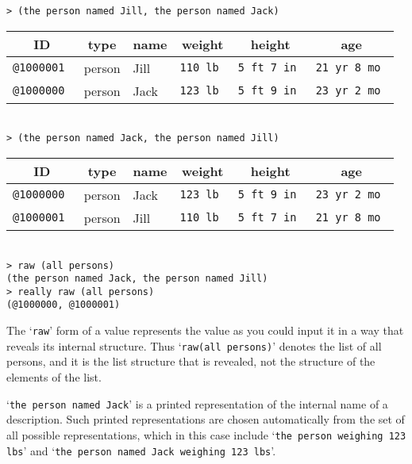 \documentclass[12pt]{article}
\newenvironment{indpar}[1][0.3in]%
	{\begin{list}{}%
		     {\setlength{\itemsep}{0in}%
		      \setlength{\topsep}{0in}%
		      \setlength{\parsep}{1ex}%
		      \setlength{\labelwidth}{#1}%
		      \setlength{\leftmargin}{#1}%
		      \addtolength{\leftmargin}{\labelsep}}%
	 \item}%
	{\end{list}}
\begin{document}
\begin{indpar}
\verb|> (the person named Jill, the person named Jack)| \\
\begin{tabular}{|r|l|l|r|r|r|}
\hline
\multicolumn{1}{|c}{\bf ID} &
\multicolumn{1}{|c}{\bf type} &
\multicolumn{1}{|c}{\bf name} &
\multicolumn{1}{|c}{\bf weight} &
\multicolumn{1}{|c}{\bf height} &
\multicolumn{1}{|c|}{\bf age} \\
\hline
\tt @1000001 & person & Jill & \tt 110 lb & \tt 5 ft 7 in & \tt 21 yr 8 mo \\
\tt @1000000 & person & Jack & \tt 123 lb & \tt 5 ft 9 in & \tt 23 yr 2 mo \\
\hline
\end{tabular} \\[0.5ex]
\verb|> (the person named Jack, the person named Jill)| \\
\begin{tabular}{|r|l|l|r|r|r|}
\hline
\multicolumn{1}{|c}{\bf ID} &
\multicolumn{1}{|c}{\bf type} &
\multicolumn{1}{|c}{\bf name} &
\multicolumn{1}{|c}{\bf weight} &
\multicolumn{1}{|c}{\bf height} &
\multicolumn{1}{|c|}{\bf age} \\
\hline
\tt @1000000 & person & Jack & \tt 123 lb & \tt 5 ft 9 in & \tt 23 yr 2 mo \\
\tt @1000001 & person & Jill & \tt 110 lb & \tt 5 ft 7 in & \tt 21 yr 8 mo \\
\hline
\end{tabular} \\[0.5ex]
\verb|> raw (all persons)| \\
\verb|(the person named Jack, the person named Jill)| \\
\verb|> really raw (all persons)| \\
\verb|(@1000000, @1000001)|
\end{indpar}

The `{\tt raw}' form of a value represents the value
as you could input it in a way that reveals its internal structure.  Thus
`{\tt raw(all~persons)}' denotes the list of all persons, and it is the list
structure that is revealed, not the structure of the elements of the list.

`{\tt the person named Jack}' is a printed representation of the
internal name of a description.  Such printed representations are chosen
automatically from the set of all possible representations, which
in this case include `{\tt the person weighing 123 lbs}' and
`{\tt the person named Jack weighing 123 lbs}'.
\end{document}
